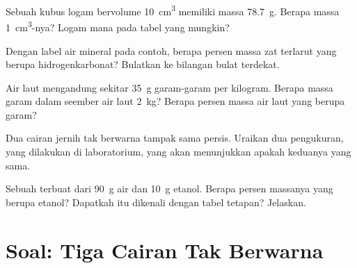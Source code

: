 \begin{exercise}[$\star\star$]\label{exo:g6:pure-substances-and-mixtures:8}
Sebuah kubus logam bervolume \qty{10}{cm^3} memiliki massa
\qty{78.7}{g}. Berapa massa \qty{1}{cm^3}-nya? Logam mana pada tabel
yang mungkin?
\end{exercise}

\begin{exercise}[$\star\star$]\label{exo:g6:pure-substances-and-mixtures:9}
Dengan label air mineral pada contoh, berapa persen massa zat terlarut
yang berupa hidrogenkarbonat? Bulatkan ke bilangan bulat terdekat.
\end{exercise}

\begin{exercise}[$\star\star$]\label{exo:g6:pure-substances-and-mixtures:10}
Air laut mengandung sekitar \qty{35}{g} garam-garam per kilogram.
Berapa massa garam dalam seember air laut \qty{2}{kg}? Berapa persen
massa air laut yang berupa garam?
\end{exercise}

\begin{exercise}[$\star\star\star$]\label{exo:g6:pure-substances-and-mixtures:11}
Dua cairan jernih tak berwarna tampak sama persis. Uraikan dua
pengukuran, yang dilakukan di laboratorium, yang akan menunjukkan apakah
keduanya  yang sama.
\end{exercise}

\begin{exercise}[$\star\star\star$]\label{exo:g6:pure-substances-and-mixtures:12}
Sebuah  terbuat dari \qty{90}{g} air dan \qty{10}{g} etanol.
Berapa persen massanya yang berupa etanol? Dapatkah  itu
dikenali dengan tabel tetapan? Jelaskan.
\end{exercise}

\section{Soal: Tiga Cairan Tak Berwarna}

